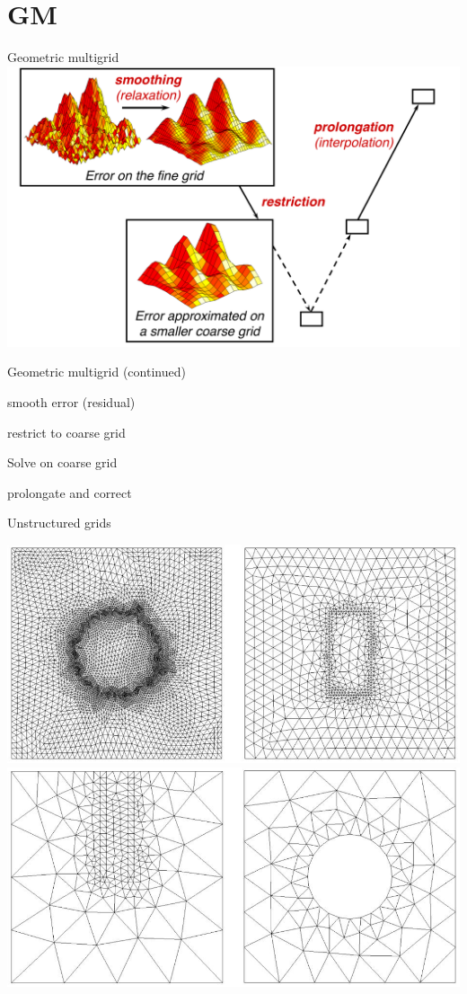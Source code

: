 \documentclass[12pt]{beamer}
\begin{document}
\section{GM}
\begin{frame}{Geometric multigrid}
  \includegraphics[width=1\textwidth]{Vcycle}
\end{frame}


\begin{frame}{Geometric multigrid (continued)}

\begin{description}[align=right]
  \item[Step 1:] smooth error (residual)
  \item[Step 2:] restrict to coarse grid
  \item[Step 3:] Solve on coarse grid
  \item[Step 4:] prolongate and correct
\end{description}

\end{frame}

\begin{frame}{Unstructured grids}
\begin{centering}

\includegraphics[width=.5\textwidth]{Grid1}\\

\includegraphics[width=.5\textwidth]{Grid2}

\end{centering}

\end{frame}
\end{document}
